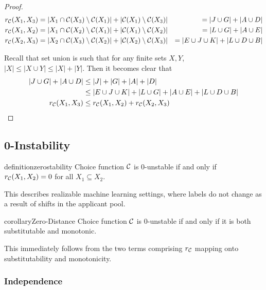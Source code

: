 \begin{proof}
\begin{align*}
    r_{\mathcal{C}}(X_1, X_3) & = |X_1 \cap \mathcal{C}(X_3) \setminus \mathcal{C}(X_1)| + |\mathcal{C}(X_1) \setminus \mathcal{C}(X_3)| & = |J \cup G| + |A \cup D|  \\
    r_{\mathcal{C}}(X_1, X_2) & = |X_1 \cap \mathcal{C}(X_2) \setminus \mathcal{C}(X_1)| + |\mathcal{C}(X_1) \setminus \mathcal{C}(X_2)| & = |L \cup G| + |A \cup E|  \\
    r_{\mathcal{C}}(X_2, X_3) & = |X_2 \cap \mathcal{C}(X_3) \setminus \mathcal{C}(X_2)| + |\mathcal{C}(X_2) \setminus \mathcal{C}(X_3)| & = |E \cup J \cup K| + |L \cup D \cup B| \\
\end{align*}

Recall that set union is such that %
for any finite sets $X, Y$, $|X| \leq |X \cup Y| \leq |X| + |Y|$.
Then it becomes clear that
\begin{align*}
    |J \cup G| + |A \cup D| & \leq |J| + |G| + |A| + |D| \\
    & \leq |E \cup J \cup K| + |L \cup G| + |A \cup E| + |L \cup D \cup B| \\
    r_{\mathcal{C}}(X_1, X_3) & \leq r_{\mathcal{C}}(X_1, X_2) + r_{\mathcal{C}}(X_2, X_3)
\end{align*}
\end{proof}

\subsection{0-Instability}\label{sec:0-unstable-appendix}

\begin{restatable}[$0$-Instability]{definition}{zerostability}
\label{def:zero-instability}
Choice function $\mathcal{C}$ is 0-unstable if and only if $r_{\mathcal{C}}(X_1, X_2) = 0$ for all $X_1 \subseteq X_2$.
\end{restatable}

This describes realizable machine learning settings, where labels do not change as a result of shifts in the applicant pool.

\begin{restatable}{corollary}{Zero-Distance}
\label{thm:sub-mon-zero}
Choice function $\mathcal{C}$ is 0-unstable if and only if it is both substitutable and monotonic.
\end{restatable}


This immediately follows from the two terms comprising $r_{\mathcal{C}}$ mapping onto substitutability and monotonicity.

\subsubsection{Independence}

